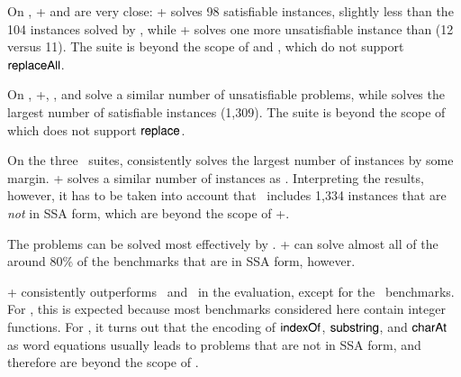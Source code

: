 On {\slogbenchra}, {\ostrich}+ and {\cvc} are very close: {\ostrich}+ solves 98 satisfiable instances, slightly less than the 104 instances solved by {\cvc}, while {\ostrich}+ solves one more unsatisfiable instance than {\cvc} (12 versus 11). The suite is beyond the scope of {\zthree} and {\zthreetrau}, which do not support $\mathsf{replaceAll}$.

On {\slogbenchr}, {\ostrich}+, {\cvc}, and {\zthree} solve a similar
number of unsatisfiable problems, while {\cvc} solves the largest
number of satisfiable instances (1,309). The  suite %
is beyond the scope of {\zthreetrau} which does not support
$\mathsf{replace}$.

On the three \pyexbench\ suites, {\zthreetrau} consistently solves the
largest number of instances by some margin. \ostrich+ solves a similar
number of instances as \zthree. Interpreting the results, however, it
has to be taken into account that \pyexbench\  includes 1,334  instances
that are \emph{not} in SSA form, which are beyond the scope of
\ostrich+.

%
%

The {\kaluzabench} problems can be solved most effectively by {\cvc}. \ostrich+ can solve almost all of the around 80\% of the benchmarks
that are in SSA form, however.
%

\ostrich+ consistently outperforms \ostrichi\ and \ostrichii\ in the
evaluation, except for the \kaluzabench\ benchmarks. For
\ostrichi, this is expected because most benchmarks considered
here contain integer functions. For \ostrichii, it turns out that the
encoding of $\mathsf{indexOf}$, $\mathsf{substring}$, and $\mathsf{charAt}$ as word equations
usually leads to problems that are not in SSA form, and therefore are
beyond the scope of \ostrich.

